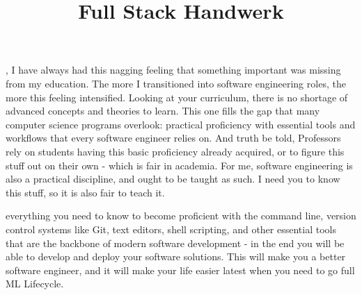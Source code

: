 \documentclass{../sharedAssets/tufte}
\title{Full Stack Handwerk}
\author[\defaultauthor]{\defaultauthor}
\begin{document}
\makestandardfrontmatter
\tableofcontents


  
  , I have always had this nagging feeling that something important was missing from my education.
  The more I transitioned into software engineering roles, the more this feeling intensified.
  Looking at your curriculum, there is no shortage of advanced concepts and theories to learn. This one fills the gap
  that many computer science programs overlook: practical proficiency with essential tools and workflows that every software engineer relies on.
  And truth be told, Professors rely on students having this basic proficiency already acquired, or to figure this stuff out on their own - which is fair in academia.
  For me, software engineering is also a practical discipline, and ought to be taught as such. I need you to know this stuff, so it is also fair to teach it.
   
   everything you need to know to become proficient with the command line, version control systems like Git,
  text editors, shell scripting, and other essential tools that are the backbone of modern software development - in the end you will be able to develop and deploy 
  your software solutions. This will make you a better software engineer, and it will make your life easier latest when you need to go full ML Lifecycle.

\mainmatter
\authorinrectoheader

\end{document}
